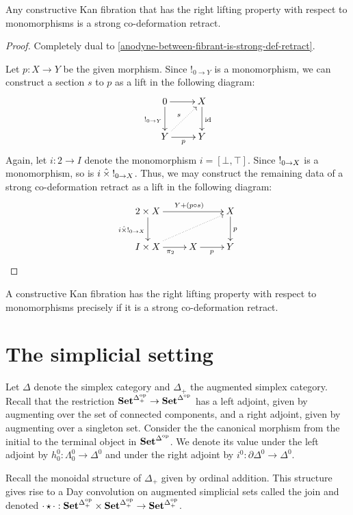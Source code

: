 \documentclass[reqno,10pt,a4paper,oneside]{amsart}
\begin{document}
\begin{lemma}
Any constructive Kan fibration that has the right lifting property with respect to monomorphisms is a strong co-deformation retract.
\end{lemma}

\begin{proof}
Completely dual to \cref{anodyne-between-fibrant-is-strong-def-retract}.

Let $p : X \to Y$ be the given morphism.
Since $!_{0 \to Y}$ is a monomorphism, we can construct a section $s$ to $p$ as a lift in the following diagram:
\[
\xymatrix{
  0
  \ar[r]
  \ar[d]_{\canonical_{0 \to Y}}
&
  X
  \ar[d]^{\id}
\\
  Y
  \ar[r]_{p}
  \ar@{.>}[ur]^{s}
&
  Y
}
\]
Again, let $i : 2 \to I$ denote the monomorphism $i = [\bot, \top]$.
Since $\mathord{!}_{0 \to X}$ is a monomorphism, so is $i \mathbin{\hat{\times}} \mathord{!}_{0 \to X}$.
Thus, we may construct the remaining data of a strong co-deformation retract as a lift in the following diagram:
\[
\xymatrix{
  2 \times X
  \ar[rr]^{Y + (p \cc s)}
  \ar[d]_{i \hattimes \canonical_{0 \to X}}
&&
  X
  \ar[d]^{p}
\\
  I \times X
  \ar[r]_{\pi_2}
  \ar@{.>}[urr]
&
  X
  \ar[r]_{p}
&
  Y
}
\]
\end{proof}

\begin{corollary}
A constructive Kan fibration has the right lifting property with respect to monomorphisms precisely if it is a strong co-deformation retract.
\end{corollary}

\section{The simplicial setting}

Let $\Delta$ denote the simplex category and $\Delta_+$ the augmented simplex category.
Recall that the restriction $\mathbf{Set}^{\Delta_+^{\mathrm{op}}} \to \mathbf{Set}^{\Delta^{\mathrm{op}}}$ has a left adjoint, given by augmenting over the set of connected components, and a right adjoint, given by augmenting over a singleton set.
Consider the the canonical morphism from the initial to the terminal object in $\mathbf{Set}^{\Delta^{\mathrm{op}}}$.
We denote its value under the left adjoint by $h_0^0 : \Lambda_0^0 \to \Delta^0$ and under the right adjoint by $i^0 : \partial \Delta^0 \to \Delta^0$.

Recall the monoidal structure of $\Delta_+$ given by ordinal addition.
This structure gives rise to a Day convolution on augmented simplicial sets called the join and denoted $\mathop{\cdot} \star \mathop{\cdot} : \mathbf{Set}^{\Delta_+^{\mathrm{op}}} \times \mathbf{Set}^{\Delta_+^{\mathrm{op}}} \to \mathbf{Set}^{\Delta_+^{\mathrm{op}}}$.
\end{document}
